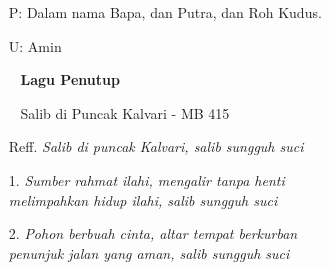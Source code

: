 \documentclass[a5paper,headsepline,titlepage,10pt,nnormalheadings,DIVcalc]{scrbook}
\newcommand{\BU}[1]{\begin{itemize} \item[U:] #1 \end{itemize}}
\newcommand{\BP}[1]{\begin{itemize} \item[P:] #1 \end{itemize}}
\begin{document}
\BP{Dalam nama Bapa, dan Putra, dan Roh Kudus. }
\BU{Amin}

\begin{itemize}
\item[~] {\bf Lagu Penutup}
\item[~] Salib di Puncak Kalvari - MB 415
\item[Reff.] \it{
Salib di puncak Kalvari, salib sungguh suci 
}
\item[1.] \it{
Sumber rahmat ilahi, mengalir tanpa henti\\
melimpahkan hidup ilahi, salib sungguh suci
}
\item[2.] \it{
Pohon berbuah cinta, altar tempat berkurban\\
penunjuk jalan yang aman, salib sungguh suci
}
\end{itemize}
\end{document}

